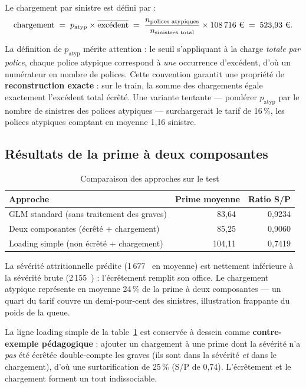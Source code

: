 \documentclass[11pt,a4paper]{article}
\newcommand{\eur}{\texteuro}
\begin{document}
Le chargement par sinistre est défini par :
\begin{equation}
    \text{chargement} \;=\; p_{\text{atyp}} \times \overline{\text{excédent}}
    \;=\; \frac{n_{\text{polices atypiques}}}{n_{\text{sinistres total}}} \times 108\,716~\text{\eur}
    \;=\; 523{,}93~\text{\eur}.
\end{equation}

La définition de $p_{\text{atyp}}$ mérite attention : le seuil s'appliquant à la charge \emph{totale par police}, chaque police atypique correspond à \emph{une} occurrence d'excédent, d'où un numérateur en nombre de polices. Cette convention garantit une propriété de \textbf{reconstruction exacte} : sur le train, la somme des chargements égale exactement l'excédent total écrêté. Une variante tentante --- pondérer $p_{\text{atyp}}$ par le nombre de sinistres des polices atypiques --- surchargerait le tarif de 16\,\%, les polices atypiques comptant en moyenne 1{,}16 sinistre.

\subsection{Résultats de la prime à deux composantes}

\begin{table}[H]
\centering
\caption{Comparaison des approches sur le test}
\begin{tabular}{lrr}
\toprule
Approche & Prime moyenne & Ratio S/P \\
\midrule
GLM standard (sans traitement des graves) & 83{,}64~\eur & 0{,}9234 \\
Deux composantes (écrêté $+$ chargement) & 85{,}25~\eur & 0{,}9060 \\
Loading simple (non écrêté $+$ chargement) & 104{,}11~\eur & 0{,}7419 \\
\bottomrule
\end{tabular}
\label{tab:sp2comp}
\end{table}

La sévérité attritionnelle prédite (1\,677~\eur{} en moyenne) est nettement inférieure à la sévérité brute (2\,155~\eur) : l'écrêtement remplit son office. Le chargement atypique représente en moyenne 24\,\% de la prime à deux composantes --- un quart du tarif couvre un demi-pour-cent des sinistres, illustration frappante du poids de la queue.

La ligne \og loading simple \fg{} de la table~\ref{tab:sp2comp} est conservée à dessein comme \textbf{contre-exemple pédagogique} : ajouter un chargement à une prime dont la sévérité n'a \emph{pas} été écrêtée double-compte les graves (ils sont dans la sévérité \emph{et} dans le chargement), d'où une surtarification de 25\,\% (S/P de 0{,}74). L'écrêtement et le chargement forment un tout indissociable.
\end{document}
